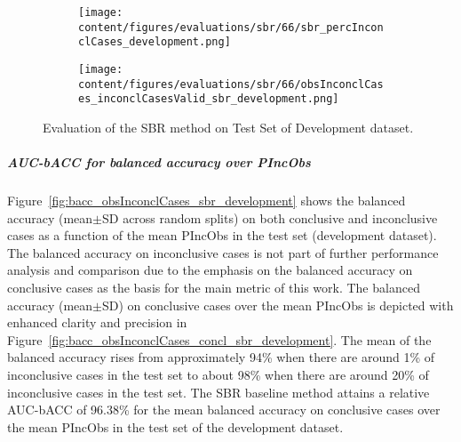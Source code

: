 \begin{figure}[ht]
  \begin{subfigure}{0.48\textwidth}
    \centering
    \texttt{[image: content/figures/evaluations/sbr/66/sbr\_percInconclCases\_development.png]}
    \label{fig:sbr_percInconclCases_development}
  \end{subfigure}
  \hfill
  \begin{subfigure}{0.495\textwidth}
    \centering
    \texttt{[image: content/figures/evaluations/sbr/66/obsInconclCases\_inconclCasesValid\_sbr\_development.png]}
    \label{fig:obsInconclCases_inconclCasesValid_sbr_development}
  \end{subfigure}

  \caption{Evaluation of the SBR method on Test Set of Development dataset.}
  \label{fig:}
\end{figure}

\subparagraph{AUC-bACC for balanced accuracy over PIncObs}

Figure~\ref{fig:bacc_obsInconclCases_sbr_development} shows the balanced accuracy (mean$\pm$SD across random splits) 
on both conclusive and inconclusive cases as a function of the mean PIncObs
in the test set (development dataset).
The balanced accuracy on inconclusive cases is not part of further performance analysis and comparison 
due to the emphasis on the balanced accuracy on conclusive cases as the basis for the main metric of this work.
The balanced accuracy (mean$\pm$SD) on conclusive cases over the mean PIncObs
is depicted with enhanced clarity and precision in Figure~\ref{fig:bacc_obsInconclCases_concl_sbr_development}.
The mean of the balanced accuracy rises from approximately 94\% 
when there are around 1\% of inconclusive cases in the test set to about 98\% 
when there are around 20\% of inconclusive cases in the test set.
The SBR baseline method attains a relative AUC-bACC of 96.38\% for the mean balanced accuracy on conclusive cases
over the mean PIncObs in the test set of the development dataset.

